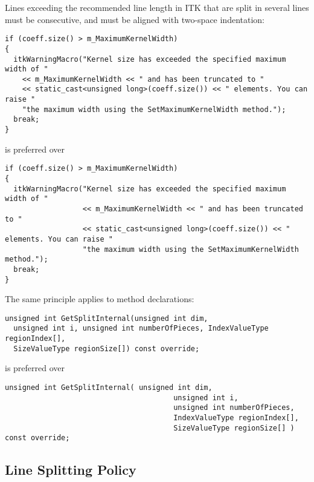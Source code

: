 Lines exceeding the recommended line length in ITK that are split in several
lines must be consecutive, and must be aligned with two-space indentation:

\small
\begin{verbatim}
if (coeff.size() > m_MaximumKernelWidth)
{
  itkWarningMacro("Kernel size has exceeded the specified maximum width of "
    << m_MaximumKernelWidth << " and has been truncated to "
    << static_cast<unsigned long>(coeff.size()) << " elements. You can raise "
    "the maximum width using the SetMaximumKernelWidth method.");
  break;
}
\end{verbatim}
\normalsize

is preferred over

\small
\begin{verbatim}
if (coeff.size() > m_MaximumKernelWidth)
{
  itkWarningMacro("Kernel size has exceeded the specified maximum width of "
                  << m_MaximumKernelWidth << " and has been truncated to "
                  << static_cast<unsigned long>(coeff.size()) << " elements. You can raise "
                  "the maximum width using the SetMaximumKernelWidth method.");
  break;
}
\end{verbatim}
\normalsize

The same principle applies to method declarations:

\small
\begin{verbatim}
unsigned int GetSplitInternal(unsigned int dim,
  unsigned int i, unsigned int numberOfPieces, IndexValueType regionIndex[],
  SizeValueType regionSize[]) const override;
\end{verbatim}
\normalsize

is preferred over

\small
\begin{verbatim}
unsigned int GetSplitInternal( unsigned int dim,
                                       unsigned int i,
                                       unsigned int numberOfPieces,
                                       IndexValueType regionIndex[],
                                       SizeValueType regionSize[] ) const override;
\end{verbatim}
\normalsize


\subsection{Line Splitting Policy}
\label{subsec:LineSplittingPolicy}

